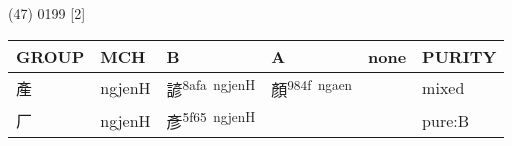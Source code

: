 \documentclass[14pt,a4paper]{scrartcl}
\begin{document}
(47) 0199 {[}2{]}

\begin{longtable}[c]{@{}llllll@{}}
\toprule
\begin{minipage}[b]{0.14\columnwidth}\raggedright\strut
GROUP
\strut\end{minipage} &
\begin{minipage}[b]{0.14\columnwidth}\raggedright\strut
MCH
\strut\end{minipage} &
\begin{minipage}[b]{0.14\columnwidth}\raggedright\strut
B
\strut\end{minipage} &
\begin{minipage}[b]{0.14\columnwidth}\raggedright\strut
A
\strut\end{minipage} &
\begin{minipage}[b]{0.14\columnwidth}\raggedright\strut
none
\strut\end{minipage} &
\begin{minipage}[b]{0.14\columnwidth}\raggedright\strut
PURITY
\strut\end{minipage}\tabularnewline
\midrule
\endhead
\begin{minipage}[t]{0.14\columnwidth}\raggedright\strut
產
\strut\end{minipage} &
\begin{minipage}[t]{0.14\columnwidth}\raggedright\strut
ngjenH
\strut\end{minipage} &
\begin{minipage}[t]{0.14\columnwidth}\raggedright\strut
諺\textsuperscript{8afa~ngjenH}
\strut\end{minipage} &
\begin{minipage}[t]{0.14\columnwidth}\raggedright\strut
顏\textsuperscript{984f~ngaen}
\strut\end{minipage} &
\begin{minipage}[t]{0.14\columnwidth}\raggedright\strut
\strut\end{minipage} &
\begin{minipage}[t]{0.14\columnwidth}\raggedright\strut
mixed
\strut\end{minipage}\tabularnewline
\begin{minipage}[t]{0.14\columnwidth}\raggedright\strut
厂
\strut\end{minipage} &
\begin{minipage}[t]{0.14\columnwidth}\raggedright\strut
ngjenH
\strut\end{minipage} &
\begin{minipage}[t]{0.14\columnwidth}\raggedright\strut
彥\textsuperscript{5f65~ngjenH}
\strut\end{minipage} &
\begin{minipage}[t]{0.14\columnwidth}\raggedright\strut
\strut\end{minipage} &
\begin{minipage}[t]{0.14\columnwidth}\raggedright\strut
\strut\end{minipage} &
\begin{minipage}[t]{0.14\columnwidth}\raggedright\strut
pure:B
\strut\end{minipage}\tabularnewline
\bottomrule
\end{longtable}
\end{document}
